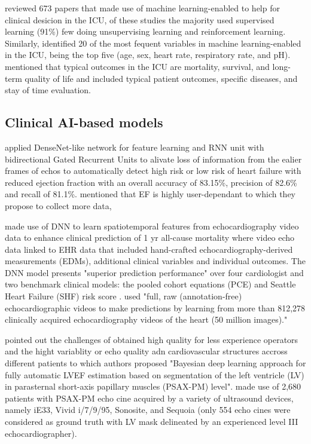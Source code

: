 \cite{hong2022} reviewed 673 papers that made use of machine learning-enabled to help for clinical desicion in the ICU, of these studies the majority used supervised learning (91\%) few doing unsupervising learning and reinforcement learning.
Similarly, \cite{hong2022} identified 20 of the most fequent variables in machine learning-enabled in the ICU, being the top five (age, sex, heart rate, respiratory rate, and pH).
\cite{hong2022} mentioned that typical outcomes in the ICU are mortality, survival, and long-term quality of life and included typical patient outcomes, specific diseases, and stay of time evaluation. 

\subsection{Clinical AI-based models}

\cite{behnami2020} applied DenseNet-like network for feature learning and RNN unit with bidirectional Gated Recurrent Units to alivate loss of information from the ealier frames of echos to automatically detect high risk or low risk of heart failure with reduced ejection fraction with an overall accuracy of 83.15\%, precision of 82.6\% and recall of 81.1\%.
\cite{behnami2020} mentioned that EF is highly user-dependant to which they propose to collect more data, 

\cite{ulloaCerna2021} made use of DNN to learn spatiotemporal features from echocardiography video data to enhance clinical prediction of 1 yr all-cause mortality where video echo data linked to EHR data that included hand-crafted echocardiography-derived measurements (EDMs), additional clinical variables and individual outcomes.
The DNN model presents "superior prediction performance" over four cardiologist and two benchmark clinical models: the pooled cohort equations (PCE) and Seattle Heart Failure (SHF) risk score \cite{ulloaCerna2021}. 
\cite{ulloaCerna2021} used "full, raw (annotation-free) echocardiographic videos to make predictions by learning from more than 812,278 clinically acquired echocardiography videos of the heart (50 million images)."


\cite{jafari2021} pointed out the challenges of obtained high quality for less experience operators and the hight variablity or echo quality adn cardiovascular structures accross different patients to which authors proposed "Bayesian deep learning approach for fully automatic LVEF estimation based on segmentation of the left ventricle (LV) in parasternal short-axis papillary muscles (PSAX-PM) level". 
\cite{jafari2021} made use of 2,680 patients with PSAX-PM echo cine acquired by a variety of ultrasound devices, namely iE33, Vivid i/7/9/95, Sonosite, and Sequoia (only 554 echo cines were considered as ground truth with LV mask delineated by an experienced level III
echocardiographer).


